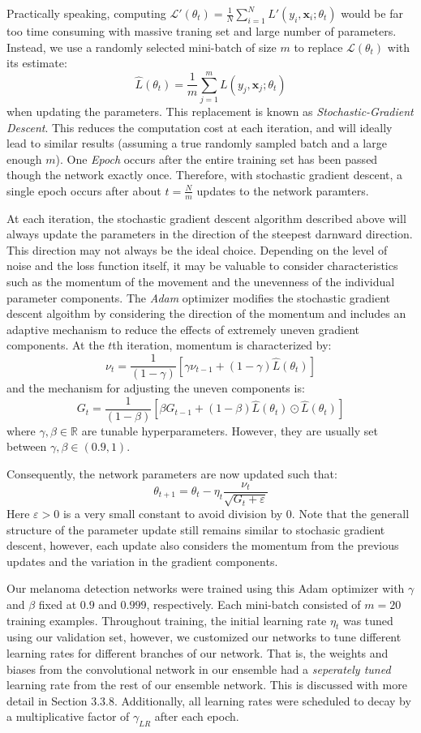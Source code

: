 \documentclass [MAS] {uclathes}
\begin{document}
Practically speaking, computing $\mathcal{L}'(\theta_t) = \frac{1}{N} \sum_{i=1}^{N} L'(y_i, \mathbf{x}_i; \theta_t)$ would be far too time consuming with massive traning set and large number of parameters. Instead, we use a randomly selected mini-batch of size $m$ to replace $\mathcal{L}(\theta_t)$ with its estimate: $$\hat{L}(\theta_t) = \frac{1}{m} \sum_{j=1}^{m} L(y_j, \mathbf{x}_j; \theta_t)$$ when updating the parameters. This replacement is known as \textit{Stochastic-Gradient Descent}. This reduces the computation cost at each iteration, and will ideally lead to similar results (assuming a true randomly sampled batch and a large enough $m$). One \textit{Epoch} occurs after the entire training set has been passed though the network exactly once. Therefore, with stochastic gradient descent, a single epoch occurs after about $t=\frac{N}{m}$ updates to the network paramters.

At each iteration, the stochastic gradient descent algorithm described above will always update the parameters in the direction of the steepest darnward direction. This direction may not always be the ideal choice. Depending on the level of noise and the loss function itself, it may be valuable to consider characteristics such as the momentum of the movement and the unevenness of the individual parameter components. The \textit{Adam} optimizer modifies the stochastic gradient descent algoithm by considering the direction of the momentum and includes an adaptive mechanism to reduce the effects of extremely uneven gradient components. At the $t$th iteration, momentum is characterized by: $$\nu_t = \frac{1}{(1-\gamma)} \left[ \gamma \nu_{t-1} + (1-\gamma)\hat{L}(\theta_t) \right]$$ and the mechanism for adjusting the uneven components is: $$G_t = \frac{1}{(1-\beta)} \left[ \beta G_{t-1} + (1-\beta)\hat{L}(\theta_t) \odot \hat{L}(\theta_t)\right]$$ where $\gamma, \beta \in \mathbb{R}$ are tunable hyperparameters. However, they are usually set between $\gamma, \beta \in (0.9, 1)$. 

Consequently, the network parameters are now updated such that: $$\theta_{t+1} = \theta_{t} - \eta_t \frac{\nu_t}{\sqrt{G_t + \varepsilon}}$$ Here $\varepsilon>0$ is a very small constant to avoid division by 0. Note that the generall structure of the parameter update still remains similar to stochasic gradient descent, however, each update also considers the momentum from the previous updates and the variation in the gradient components.

Our melanoma detection networks were trained using this Adam optimizer with $\gamma$ and $\beta$ fixed at $0.9$ and $0.999$, respectively. Each mini-batch consisted of $m=20$ training examples.  Throughout training, the initial learning rate $\eta_t$ was tuned using our validation set, however, we customized our networks to tune different learning rates for different branches of our network. That is, the weights and biases from the convolutional network in our ensemble had a \textit{seperately tuned} learning rate from the rest of our ensemble network. This is discussed with more detail in Section 3.3.8. Additionally, all learning rates were scheduled to decay by a multiplicative factor of $\gamma_{LR}$ after each epoch.
\end{document}
